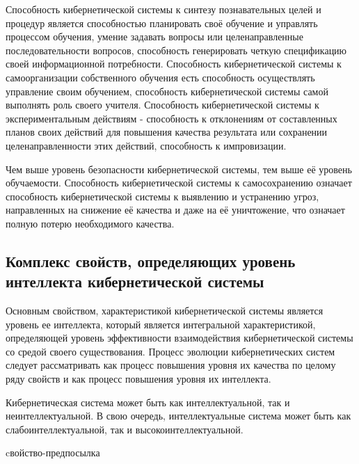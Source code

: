 Способность кибернетической системы к синтезу познавательных целей и процедур является способностью планировать своё обучение и управлять процессом обучения, умение задавать вопросы или целенаправленные последовательности вопросов, способность генерировать четкую спецификацию своей информационной потребности.
Способность кибернетической системы к самоорганизации собственного обучения есть способность осуществлять управление своим обучением, способность кибернетической системы самой выполнять роль своего учителя.
Способность кибернетической системы к экспериментальным действиям - способность к отклонениям от составленных планов своих действий для повышения качества результата или сохранении целенаправленности этих действий, способность к импровизации.

Чем выше уровень безопасности кибернетической системы, тем выше её уровень обучаемости.
Способность кибернетической системы к самосохранению означает способность кибернетической системы к выявлению и устранению угроз, направленных на снижение её качества и даже на её уничтожение, что означает полную потерю необходимого качества.


\subsection{Комплекс свойств, определяющих уровень интеллекта кибернетической системы}

Основным свойством, характеристикой кибернетической системы является уровень ее интеллекта, который является интегральной характеристикой, определяющей уровень эффективности взаимодействия кибернетической системы со средой своего существования.
Процесс эволюции кибернетических систем следует рассматривать как процесс повышения уровня их качества по целому ряду свойств и как процесс повышения уровня их интеллекта.

Кибернетическая система может быть как интеллектуальной, так и неинтеллектуальной. В свою очередь, интеллектуальные система может быть как слабоинтеллектуальной, так и высокоинтеллектуальной.

\begin{SCn}
\begin{scnrelfromlist}{cвойство-предпосылка}
\end{scnrelfromlist}
\end{SCn}

